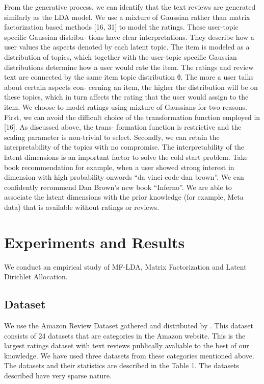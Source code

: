 \documentclass[10pt,conference]{IEEEtran}
\begin{document}
From the ge​nerative process, we can identify that the text reviews are generated similarly a​s the LDA model. We use a mixture of Gaussian rather than matrix factorizati​on based methods [16, 31] to model the ratings. These user-topic specific Gaussian distribu- t​ions have clear interpretations. They describe how a user values the aspects den​oted by each latent topic. The item is modeled as a distribution of topics, which toget​her with the user-topic specific Gaussian distributions determine how a user would ​rate the item. The ratings and review text are connected by the same item topic distr​ibution θ. The more a user talks about certain aspects con- cerning an item, the h​igher the distribution will be on these topics, which in turn affects the rating that​ the user would assign to the item. We choose to model ratings using mixture of ​Gaussians for two reasons. First, we can avoid the difficult choice of the transformat​ion function employed in [16]. As discussed above, the trans- formation function is​ restrictive and the scaling parameter is non-trivial to select. Secondly, we can reta​in the interpretability of the topics with no compromise. The interpretab​ility of the latent dimensions is an important factor to solve the cold start problem. Take book r​ecommendation for example, when a user showed strong interest in dimension with high p​robability onwords “da vinci code dan brown”. We can confidently recommend Dan Brown’s​ new book “Inferno”. We are able to associate the latent dimensions with the prior k​nowledge (for example, Meta data) that is available without ratings or reviews.


\section{Experiments and Results}
We conduct an empirical study of MF-LDA, Matrix Factorization and Latent Dirichlet Allocation.
\subsection{Dataset}

We use the Amazon Review Dataset gathered and distributed by \cite{He2016}. This dataset consists of 24 datasets that are categories in the Amazon website. This is the largest ratings dataset with text reviews publically avaliable to the best of our knowledge. We have used three datasets from these categories mentioned above. The datasets and their statistics are described in the Table 1. The datasets described have very sparse nature.
\end{document}
